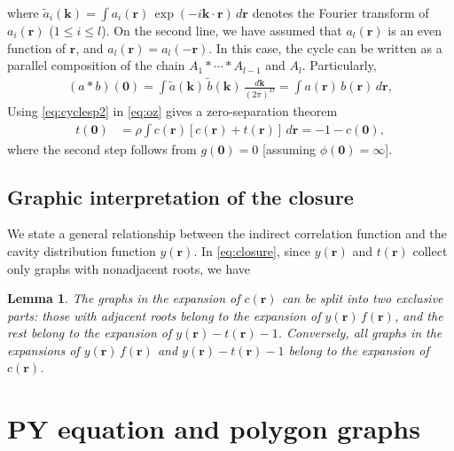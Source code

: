 \documentclass[aip,jcp,reprint,superscriptaddress]{revtex4-1}
\newtheorem{lemm}[thrm]{Lemma}
\newcommand{\vct}[1]{\mathbf{#1}}
\providecommand{\vr}{} %
\renewcommand{\vr}{\vct{r}}
\newcommand{\vk}{\vct{k}}
\newcommand{\dvk}{\frac{d\vk}{(2\pi)^D}}
\begin{document}
%
where
  $\tilde{a}_i(\vk) = \int a_i(\vr) \, \exp(-i \vk \cdot \vr) \, d\vr$
  denotes the Fourier transform of $a_i(\vr)$ ($1 \le i \le l$).
%
On the second line,
  we have assumed that
  $a_l(\vr)$ is an even function of $\vr$,
  and
  $a_l(\vr) = a_l(-\vr)$.
%
In this case,
  the cycle can be written as a parallel composition
  of the chain $A_1 * \cdots * A_{l-1}$ and $A_l$.
%
Particularly,
%
\begin{align}
      (a * b)(\vct{0})
  =
      \int \tilde{a}(\vk) \, \tilde{b}(\vk) \, \dvk
  =
      \int a(\vr) \, b(\vr) \, d\vr,
\label{eq:cyclesp2}
\end{align}
%
Using \eqref{eq:cyclesp2} in \eqref{eq:oz} gives
  a zero-separation theorem\cite{rosenfeld1978}
%
\begin{align}
  t(\vct{0})
  &= \rho \int c(\vr) [c(\vr) + t(\vr)] \, d\vr
  = -1 - c(\vct{0}),
\label{eq:zerosep}
\end{align}
%
where the second step follows from
  $g(\vct{0}) = 0$ [assuming $\phi(\vct{0}) = \infty$].





\subsection{Graphic interpretation of the closure}



We state a general relationship between the indirect correlation function
  and the cavity distribution function $y(\vr)$.
%
In \eqref{eq:closure},
since $y(\vr)$ and $t(\vr)$
collect only graphs with nonadjacent roots,
we have
%
\begin{lemm}
The graphs in the expansion of $c(\vr)$
  can be split into two exclusive parts:
  those with adjacent roots belong to
  the expansion of $y(\vr)\, f(\vr)$,
  and the rest belong to
  the expansion of $y(\vr) - t(\vr) - 1$.
Conversely,
  all graphs in the expansions of $y(\vr) \, f(\vr)$
  and $y(\vr) - t(\vr) - 1$ belong to
  the expansion of $c(\vr)$.
\label{thm:crsplit}
\end{lemm}
%





\section{\label{sec:py}PY equation and polygon graphs}
\end{document}
